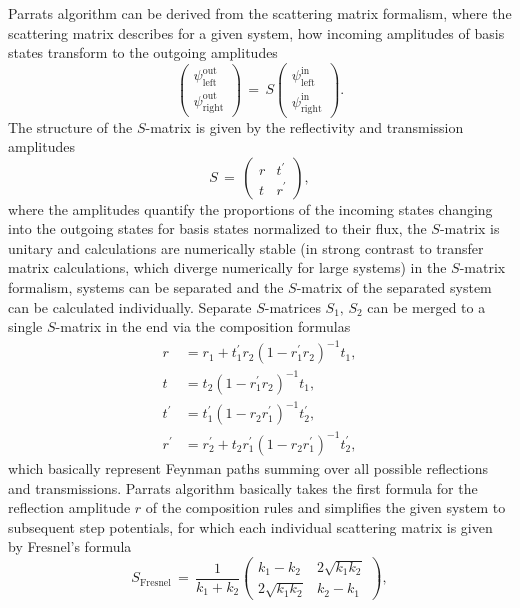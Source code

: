 \documentclass[\main/dresen_thesis.tex]{subfiles}
\begin{document}
Parrats algorithm can be derived from the scattering matrix formalism, where the scattering matrix describes for a given system, how incoming amplitudes of basis states transform to the outgoing amplitudes
\begin{equation}
\begin{pmatrix}\psi_\mathrm{left}^\mathrm{out}\\\psi_\mathrm{right}^\mathrm{out}\end{pmatrix} \, = \, S \begin{pmatrix}\psi_\mathrm{left}^\mathrm{in}\\\psi_\mathrm{right}^\mathrm{in}\end{pmatrix}.
\end{equation}
The structure of the $S$-matrix is given by the reflectivity and transmission amplitudes
\begin{equation}
S \, = \, \begin{pmatrix}
r& t^\prime\\
t& r^\prime
\end{pmatrix},
\end{equation}
where the amplitudes quantify the proportions of the incoming states changing into the outgoing states
for basis states normalized to their flux, the $S$-matrix is unitary and calculations are numerically stable (in strong contrast to transfer matrix calculations, which diverge numerically for large systems)
in the $S$-matrix formalism, systems can be separated and the $S$-matrix of the separated system can be calculated individually. Separate $S$-matrices $S_1, \, S_2$ can be merged to a single $S$-matrix in the end via the composition formulas
\begin{align}
r &= r_1 + t_1^{\prime} r_2 \left( 1-r_1^{\prime} r_2 \right)^{-1} t_1, \\
t &= t_2\left( 1-r_1^{\prime} r_2 \right)^{-1} t_1, \\
t^{\prime} &= t_1^{\prime} \left( 1- r_2 r_1^{\prime} \right)^{-1} t_2^{\prime}, \\
r^{\prime} &= r_2^{\prime} + t_2 r_1^{\prime} \left( 1-r_2 r_1^{\prime} \right)^{-1} t_2^{\prime},
\end{align}
which basically represent Feynman paths summing over all possible reflections and transmissions.
Parrats algorithm basically takes the first formula for the reflection amplitude $r$ of the composition rules and simplifies the given system to subsequent step potentials, for which each individual scattering matrix is given by Fresnel's formula
\begin{equation}
S_\mathrm{Fresnel} \, = \, \frac{1}{k_1+k_2} \begin{pmatrix}
k_1-k_2& 2 \sqrt{k_1 k_2}\\
2 \sqrt{k_1 k_2} & k_2 - k_1
\end{pmatrix},
\end{equation}
\end{document}
